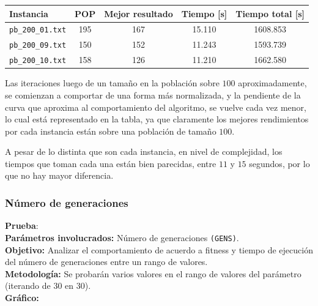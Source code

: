 \begin{center}
\begin{tabular}{|l|c|c|c|c|}
	\hline
	\textbf{Instancia} & \textbf{POP} & \textbf{Mejor resultado} & \textbf{Tiempo [s] } & \textbf{Tiempo total [s] }\\\hline
	\texttt{pb\_200\_01.txt} & 195 & 167 & 15.110 & 1608.853 \\\hline 
	\texttt{pb\_200\_09.txt} & 150 & 152 & 11.243 & 1593.739 \\\hline
	\texttt{pb\_200\_10.txt} & 158 & 126 & 11.210 & 1662.580 \\\hline
\end{tabular}
\end{center}

Las iteraciones luego de un tamaño en la población sobre $100$ aproximadamente,
se comienzan a comportar de una forma más normalizada, y la pendiente de la curva que aproxima
al comportamiento del algoritmo, se vuelve cada vez menor, lo cual está representado en la tabla,
ya que claramente los mejores rendimientos por cada instancia están sobre una población de
tamaño $100$.

A pesar de lo distinta que son cada instancia, en nivel de complejidad, los tiempos que toman
cada una están bien parecidas, entre $11$ y $15$ segundos, por lo que no hay mayor diferencia.
\newpage
\subsubsection{Número de generaciones}

\textbf{Prueba}: \\

\textbf{Parámetros involucrados:} Número de generaciones \texttt{(GENS)}.\\

\textbf{Objetivo:} Analizar el comportamiento de acuerdo a fitness y tiempo de ejecución del número de generaciones entre un rango de valores.\\

\textbf{Metodología:} Se probarán varios valores en el rango de valores del parámetro \blue{[10,2000]} (iterando de 30 en 30).\\

\textbf{Gráfico:}\\

